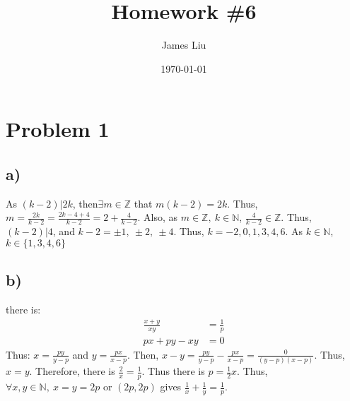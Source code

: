 \documentclass{article}
\title{\textbf{Homework \#6 }}
\author{James Liu}
\date{\today }
\begin{document}
\maketitle

\section*{Problem 1}
\subsection*{a)}
As \((k-2)|2k\), then\(\exists m\in \mathbb{Z}\) that \(m(k-2)=2k\).
Thus, \(m=\frac{2k}{k-2}=\frac{2k-4+4}{k-2}=2+\frac{4}{k-2}\). Also, 
as \(m\in \mathbb{Z},\ k\in \mathbb{N}\), \(\frac{4}{k-2}\in \mathbb{Z}\).
Thus, \((k-2)|4\), and \(k-2=\pm 1,\ \pm 2,\ \pm 4\). Thus, \(k=-2, 0 ,1, 3,4,6\).
As \(k\in \mathbb{N}\), \(k\in\{1,3,4,6\}\)
\subsection*{b)}
there is:
\begin{align*}
    \frac {x+y}{xy}&=\frac{1}{p}\\
    px+py-xy&=0
\end{align*}
Thus: \(\displaystyle{x=\frac{py}{y-p}}\) and \(\displaystyle{y=\frac{px}{x-p}}\).
Then, \(x-y=\displaystyle{\frac{py}{y-p}-\frac{px}{x-p}=\frac{0}{(y-p)(x-p)}}\).
Thus, \(x=y\). Therefore, there is \(\displaystyle{\frac{2}{x}=\frac{1}{p}}\).
Thus there is \(p=\frac{1}{2}x\). Thus, \(\forall x,y\in \mathbb{N},\ x=y=2p\) or \((2p,2p)\) gives \(\frac{1}{x}+\frac{1}{y}=\frac{1}{p}\).
\newpage
\end{document}
